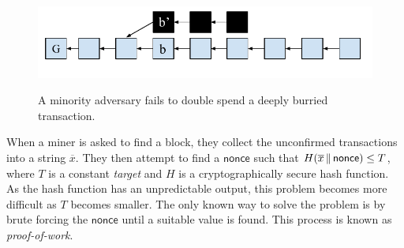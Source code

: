 \begin{figure}[h]
    \caption{
    A minority adversary fails to double spend a deeply burried transaction.
    }
    \centering
    \includegraphics[width=0.7\columnwidth,keepaspectratio]{chapters/introduction/figures/adversary-race.pdf}
    \label{fig.adversary-race}
\end{figure}

When a miner is asked to find a block, they collect the unconfirmed transactions
into a string $\overline{x}$. They then attempt to find a $\textsf{nonce}$ such
that $H(\overline{x} \,\|\, \textsf{nonce}) \leq T$, where $T$ is a constant
\emph{target} and $H$ is a cryptographically secure hash function. As the hash
function has an unpredictable output, this problem becomes more difficult as $T$
becomes smaller. The only known way to solve the problem is by brute forcing the
$\textsf{nonce}$ until a suitable value is found. This process is known as
\emph{proof-of-work}.
